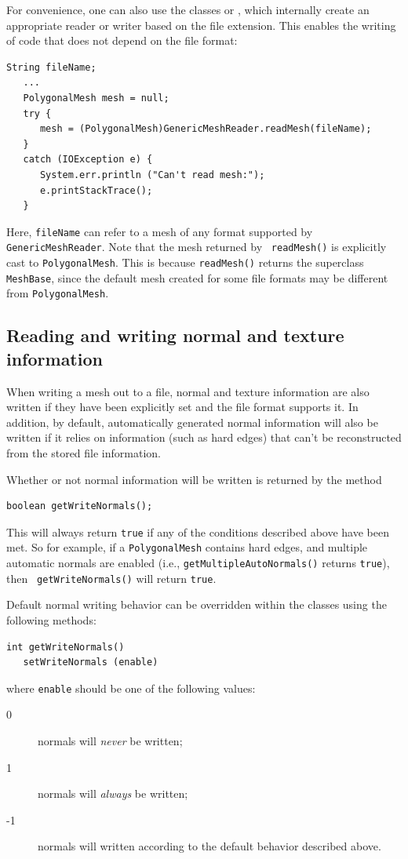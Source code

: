 For convenience, one can also use the classes
 or
, which internally
create an appropriate reader or writer based on the file
extension. This enables the writing of code
that does not depend on the file format:
%
\begin{lstlisting}[]
   String fileName;
   ...
   PolygonalMesh mesh = null;
   try {
      mesh = (PolygonalMesh)GenericMeshReader.readMesh(fileName);
   }
   catch (IOException e) {
      System.err.println ("Can't read mesh:");
      e.printStackTrace();
   }
\end{lstlisting}
%
Here, {\tt fileName} can refer to a mesh of any format supported by
{\tt GenericMeshReader}. Note that the mesh returned by {\tt
readMesh()} is explicitly cast to {\tt PolygonalMesh}.  This is
because {\tt readMesh()} returns the superclass {\tt MeshBase}, since
the default mesh created for some file formats may be different from
{\tt PolygonalMesh}.

\subsection{Reading and writing normal and texture information}

When writing a mesh out to a file, normal and texture information are
also written if they have been explicitly set and the file format
supports it. In addition, by default, automatically generated normal
information will also be written if it relies on information (such as
hard edges) that can't be reconstructed from the stored file
information.

Whether or not normal information will be written is returned by the
method
%
\begin{lstlisting}[]
   boolean getWriteNormals();
\end{lstlisting}
%
This will always return {\tt true} if any of the conditions described
above have been met.  So for example, if a {\tt PolygonalMesh}
contains hard edges, and multiple automatic normals are enabled (i.e.,
{\tt getMultipleAutoNormals()} returns {\tt true}), then {\tt
getWriteNormals()} will return {\tt true}.

Default normal writing behavior can be overridden within 
the  classes
using the following methods:
%
\begin{lstlisting}[]
   int getWriteNormals()
   setWriteNormals (enable)
\end{lstlisting}
%
where {\tt enable} should be one of the following values:
\begin{description}
\item[ 0] normals will {\it never} be written;
\item[ 1] normals will {\it always} be written;
\item[-1] normals will written according to the default behavior 
described above.
\end{description}

